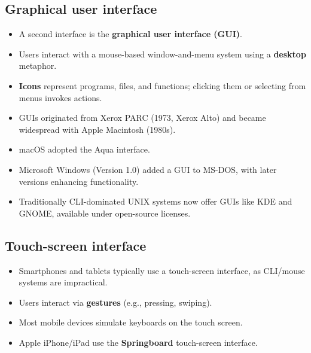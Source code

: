 \subsection*{Graphical user interface}
\begin{itemize}
    \item A second interface is the \textbf{graphical user interface (GUI)}.
    \item Users interact with a mouse-based window-and-menu system using a \textbf{desktop} metaphor.
    \item \textbf{Icons} represent programs, files, and functions; clicking them or selecting from menus invokes actions.
    \item GUIs originated from Xerox PARC (1973, Xerox Alto) and became widespread with Apple Macintosh (1980s).
    \item macOS adopted the Aqua interface.
    \item Microsoft Windows (Version 1.0) added a GUI to MS-DOS, with later versions enhancing functionality.
    \item Traditionally CLI-dominated UNIX systems now offer GUIs like KDE and GNOME, available under open-source licenses.
\end{itemize}

\subsection*{Touch-screen interface}
\begin{itemize}
    \item Smartphones and tablets typically use a touch-screen interface, as CLI/mouse systems are impractical.
    \item Users interact via \textbf{gestures} (e.g., pressing, swiping).
    \item Most mobile devices simulate keyboards on the touch screen.
    \item Apple iPhone/iPad use the \textbf{Springboard} touch-screen interface.
\end{itemize}


